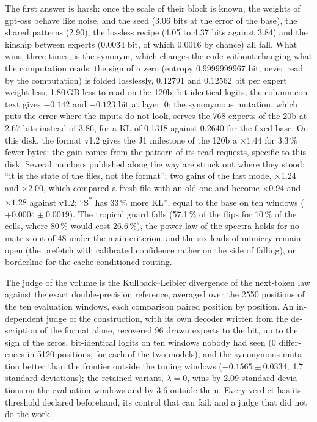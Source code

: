 \begin{otherlanguage}{english}
The first answer is harsh: once the scale of their block is known, the weights of gpt-oss behave like noise, and the seed (3.06 bits at the error of the base), the shared patterns (2.90), the lossless recipe (4.05 to 4.37 bits against 3.84) and the kinship between experts (0.0034 bit, of which 0.0016 by chance) all fall. What wins, three times, is the synonym, which changes the code without changing what the computation reads: the sign of a zero (entropy 0.9999999967 bit, never read by the computation) is folded losslessly, 0.12791 and 0.12562 bit per expert weight less, 1.80\,GB less to read on the 120b, bit-identical logits; the column context gives $-0.142$ and $-0.123$ bit at layer~0; the synonymous mutation, which puts the error where the inputs do not look, serves the 768 experts of the 20b at 2.67 bits instead of 3.86, for a KL of 0.1318 against 0.2640 for the fixed base. On this disk, the format v1.2 gives the J1 milestone of the 120b a $\times 1.44$ for 3.3\,\% fewer bytes: the gain comes from the pattern of its read requests, specific to this disk. Several numbers published along the way are struck out where they stood: ``it is the state of the files, not the format''; two gains of the fast mode, $\times 1.24$ and $\times 2.00$, which compared a fresh file with an old one and become $\times 0.94$ and $\times 1.28$ against v1.2; ``S\textsuperscript{*} has 33\,\% more KL'', equal to the base on ten windows ($+0.0004 \pm 0.0019$). The tropical guard falls (57.1\,\% of the flips for 10\,\% of the cells, where 80\,\% would cost 26.6\,\%), the power law of the spectra holds for no matrix out of 48 under the main criterion, and the six leads of mimicry remain open (the prefetch with calibrated confidence rather on the side of falling), or borderline for the cache-conditioned routing.

The judge of the volume is the Kullback--Leibler divergence of the next-token law against the exact double-precision reference, averaged over the 2550 positions of the ten evaluation windows, each comparison paired position by position. An independent judge of the construction, with its own decoder written from the description of the format alone, recovered 96 drawn experts to the bit, up to the sign of the zeros, bit-identical logits on ten windows nobody had seen (0 differences in 5120 positions, for each of the two models), and the synonymous mutation better than the frontier outside the tuning windows ($-0.1565 \pm 0.0334$, 4.7 standard deviations); the retained variant, $\lambda = 0$, wins by 2.09 standard deviations on the evaluation windows and by 3.6 outside them. Every verdict has its threshold declared beforehand, its control that can fail, and a judge that did not do the work.


\end{otherlanguage}
